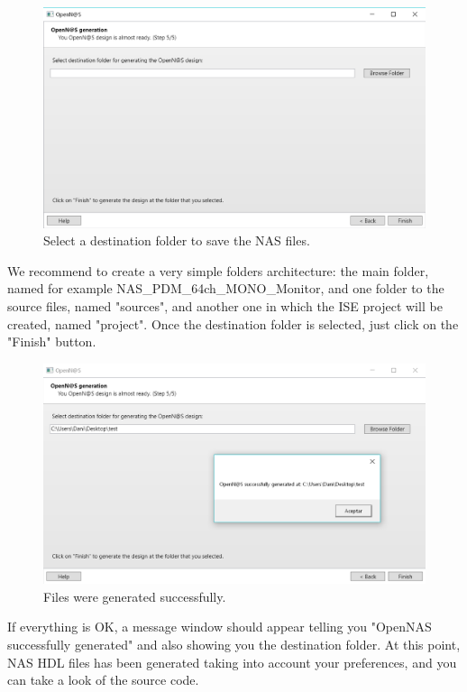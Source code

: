 \begin{figure}[H]
\centering
\includegraphics[width=1\textwidth]{images/Img24_S5_SaveFiles.PNG}
\caption{\label{fig:OpenNAS_s5_destination_folder}Select a destination folder to save the NAS files.}
\end{figure}

We recommend to create a very simple folders architecture: the main folder, named for example NAS\_PDM\_64ch\_MONO\_Monitor, and one folder to the source files, named "sources", and another one in which the ISE project will be created, named "project". Once the destination folder is selected, just click on the "Finish" button.

\begin{figure}[H]
\centering
\includegraphics[width=1\textwidth]{images/Img25_S5_SaveFiles_OK.PNG}
\caption{\label{fig:OpenNAS_s5_success}Files were generated successfully.}
\end{figure}

If everything is OK, a message window should appear telling you "OpenNAS successfully generated" and also showing you the destination folder. At this point, NAS HDL files has been generated taking into account your preferences, and you can take a look of the source code.


